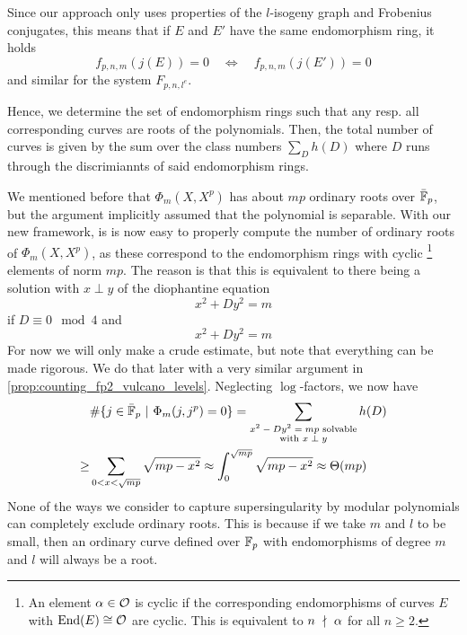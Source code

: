 Since our approach only uses properties of the $l$-isogeny graph and Frobenius conjugates, this means that if $E$ and $E'$ have the same endomorphism ring, it holds
\begin{equation*}
    f_{p, n, m}(j(E)) = 0 \quad \Leftrightarrow \quad f_{p, n, m}(j(E')) = 0
\end{equation*}
and similar for the system $F_{p, n, l^e}$.

Hence, we determine the set of endomorphism rings such that any resp. all corresponding curves are roots of the polynomials.
Then, the total number of curves is given by the sum over the class numbers $\sum_D h(D)$ where $D$ runs through the discrimiannts of said endomorphism rings. 

We mentioned before that $\Phi_m(X, X^p)$ has about $mp$ ordinary roots over $\bar{\mathbb{F}}_p$, but the argument implicitly assumed that the polynomial is separable.
With our new framework, is is now easy to properly compute the number of ordinary roots of $\Phi_m(X, X^p)$, as these correspond to the endomorphism rings with cyclic
\footnote{An element $\alpha \in \mathcal{O}$ is cyclic if the corresponding endomorphisms of curves $E$ with $\mathrm{End}(E) \cong \mathcal{O}$ are cyclic. This is equivalent to $n \ \nmid \  \alpha$ for all $n \geq 2$.}
elements of norm $mp$. 
The reason is that this is equivalent to there being a solution with $x \perp y$ of the diophantine equation
\begin{equation*}
    x^2 + D y^2 = m
\end{equation*}
if $D \equiv 0 \mod 4$ and
\begin{equation*}
    x^2 + D y^2 = m
\end{equation*}
For now we will only make a crude estimate, but note that everything can be made rigorous.
We do that later with a very similar argument in \ref{prop:counting_fp2_vulcano_levels}.
Neglecting $\log$-factors, we now have
\begin{align*}
    &\#\{ j \in \bar{\mathbb{F}}_p \ | \ \Phi_m(j, j^p) = 0 \} = \sum_{\substack{\text{$x^2 - Dy^2 = mp$ solvable}\\\text{with $x \perp y$}}} h(D) \\
    \geq& \sum_{0 < x < \sqrt{mp}} \sqrt{mp - x^2} \approx \int_0^{\sqrt{mp}} \sqrt{mp - x^2} \approx \Theta(mp)
\end{align*}
None of the ways we consider to capture supersingularity by modular polynomials can completely exclude ordinary roots.
This is because if we take $m$ and $l$ to be small, then an ordinary curve defined over $\mathbb{F}_p$ with endomorphisms of degree $m$ and $l$ will always be a root.
